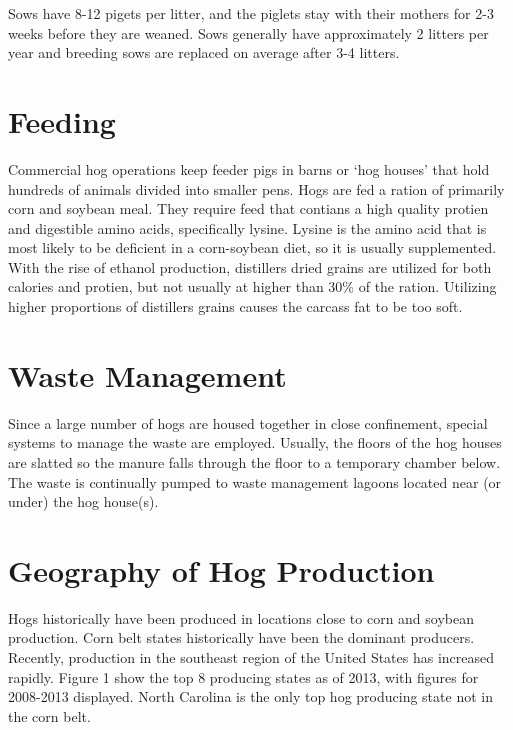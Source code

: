 \documentclass[
  letterpaper,
  DIV=11,
  numbers=noendperiod]{scrreprt}
\begin{document}
Sows have 8-12 pigets per litter, and the piglets stay with their
mothers for 2-3 weeks before they are weaned. Sows generally have
approximately 2 litters per year and breeding sows are replaced on
average after 3-4 litters.

\hypertarget{feeding}{%
\section{Feeding}\label{feeding}}

Commercial hog operations keep feeder pigs in barns or `hog houses' that
hold hundreds of animals divided into smaller pens. Hogs are fed a
ration of primarily corn and soybean meal. They require feed that
contians a high quality protien and digestible amino acids, specifically
lysine. Lysine is the amino acid that is most likely to be deficient in
a corn-soybean diet, so it is usually supplemented. With the rise of
ethanol production, distillers dried grains are utilized for both
calories and protien, but not usually at higher than 30\% of the ration.
Utilizing higher proportions of distillers grains causes the carcass fat
to be too soft.

\hypertarget{waste-management}{%
\section{Waste Management}\label{waste-management}}

Since a large number of hogs are housed together in close confinement,
special systems to manage the waste are employed. Usually, the floors of
the hog houses are slatted so the manure falls through the floor to a
temporary chamber below. The waste is continually pumped to waste
management lagoons located near (or under) the hog house(s).

\hypertarget{geography-of-hog-production}{%
\section{Geography of Hog
Production}\label{geography-of-hog-production}}

Hogs historically have been produced in locations close to corn and
soybean production. Corn belt states historically have been the dominant
producers. Recently, production in the southeast region of the United
States has increased rapidly. Figure 1 show the top 8 producing states
as of 2013, with figures for 2008-2013 displayed. North Carolina is the
only top hog producing state not in the corn belt.
\end{document}
